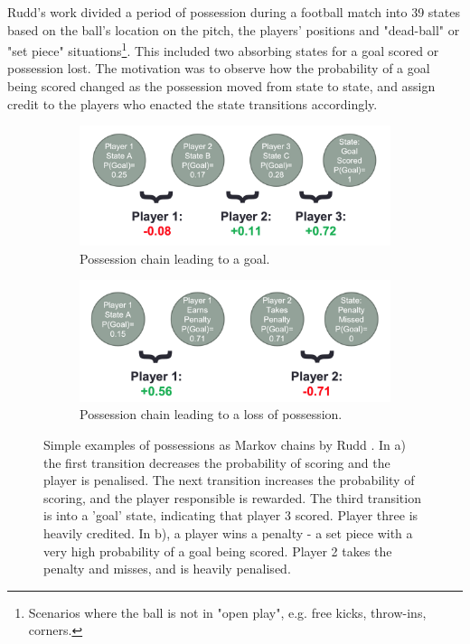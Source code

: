 \documentclass{l4proj}
\begin{document}
Rudd's work divided a period of possession during a football match into 39 states based on the ball's location on the pitch, the players' positions and "dead-ball" or "set piece" situations\footnote{Scenarios where the ball is not in "open play", e.g. free kicks, throw-ins, corners.}. This included two absorbing states for a goal scored or possession lost. The motivation was to observe how the probability of a goal being scored changed as the possession moved from state to state, and assign credit to the players who enacted the state transitions accordingly.

\begin{figure}[htb] 
    \centering
    \begin{subfigure}[a]{0.75\textwidth}
        \includegraphics[scale=0.25]{images/ruddchain1.png}
        \caption{Possession chain leading to a goal.}
        \label{fig:syn1}
    \end{subfigure}
    
    \begin{subfigure}[b]{0.75\textwidth}
        \includegraphics[scale=0.25]{images/ruddchain2.png}
        \caption{Possession chain leading to a loss of possession.}
        \label{fig:syn2}
    \end{subfigure}
    
    \caption{Simple examples of possessions as Markov chains by Rudd \cite{rudd1}. In a) the first transition decreases the probability of scoring and the player is penalised. The next transition increases the probability of scoring, and the player responsible is rewarded. The third transition is into a 'goal' state, indicating that player 3 scored. Player three is heavily credited. In b), a player wins a penalty - a set piece with a very high probability of a goal being scored. Player 2 takes the penalty and misses, and is heavily penalised.}
    \label{fig:synthetic}
\end{figure}
\end{document}
